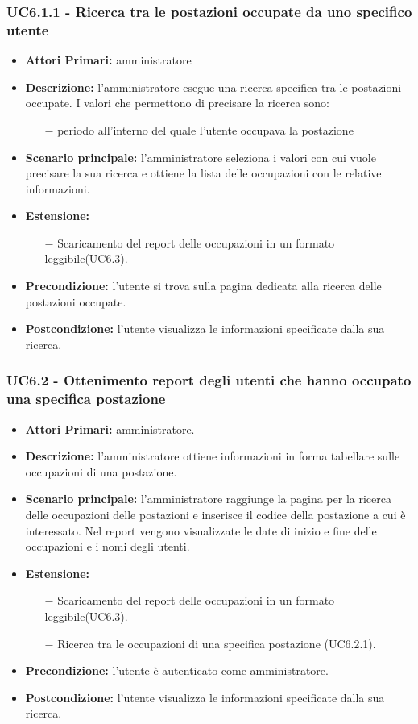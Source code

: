 \subsubsection{ UC6.1.1 - Ricerca tra le postazioni occupate da uno specifico utente}
\begin{itemize}
	\item\textbf{Attori Primari:} 
	amministratore
	\item\textbf{Descrizione:} 
	l'amministratore esegue una ricerca specifica tra le postazioni occupate.
	I valori che permettono di precisare la ricerca sono:
	\begin{itemize}
		\item[$-$] periodo all'interno del quale l'utente occupava la postazione
	\end{itemize}
	\item\textbf{Scenario principale:} 
	l'amministratore seleziona i valori con cui vuole precisare la sua ricerca e ottiene la lista delle occupazioni con le relative informazioni.
	\item\textbf{Estensione:}
	\begin{itemize}
		\item[$-$] Scaricamento del report delle occupazioni in un formato leggibile(UC6.3).
	\end{itemize}
	\item\textbf{Precondizione:} 
	l'utente si trova sulla pagina dedicata alla ricerca delle postazioni occupate.
	\item\textbf{Postcondizione:}
	l'utente visualizza le informazioni specificate dalla sua ricerca.
\end{itemize}

\subsubsection{ UC6.2 - Ottenimento report degli utenti che hanno occupato una specifica postazione}
\begin{itemize}
	\item\textbf{Attori Primari:} 
	amministratore.
	\item\textbf{Descrizione:} 
	l'amministratore ottiene informazioni in forma tabellare sulle occupazioni di una postazione.
	\item\textbf{Scenario principale:} 
	l'amministratore raggiunge la pagina per la ricerca delle occupazioni delle postazioni e inserisce il codice della postazione a cui è interessato.
	Nel report vengono visualizzate le date di inizio e fine delle occupazioni e i nomi degli utenti.
	\item\textbf{Estensione:}
	\begin{itemize}
		\item[$-$] Scaricamento del report delle occupazioni in un formato leggibile(UC6.3).
		\item[$-$] Ricerca tra le occupazioni di una specifica postazione (UC6.2.1).
	\end{itemize}
	\item\textbf{Precondizione:} 
	l'utente è autenticato come amministratore.
	\item\textbf{Postcondizione:}
	l'utente visualizza le informazioni specificate dalla sua ricerca.
\end{itemize}

